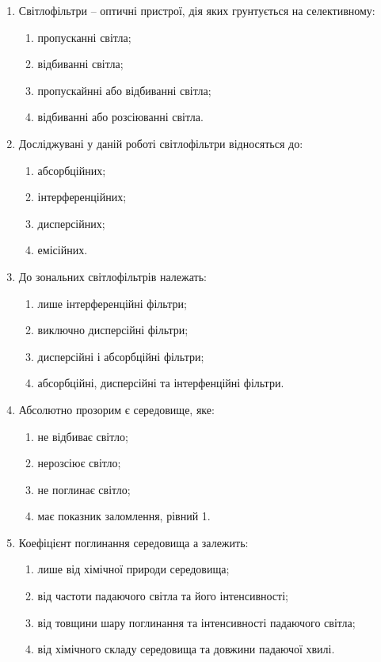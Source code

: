\documentclass[onecolumn]{el-author}
\begin{document}
\begin{enumerate}
	\item Світлофільтри -- оптичні пристрої, дія яких грунтується на
селективному:
	\begin{enumerate}
		\item пропусканні світла;
		\item відбиванні світла;
		\item пропускайнні або відбиванні світла;
		\item відбиванні або розсіюванні світла.
	\end{enumerate}
	\item Досліджувані у даній роботі світлофільтри відносяться до:
	\begin{enumerate}
		\item абсорбційних;
		\item інтерференційних;
		\item дисперсійних;
		\item емісійних.
	\end{enumerate}
	\item До зональних світлофільтрів належать:
	\begin{enumerate}
		\item лише інтерференційні фільтри;
		\item виключно дисперсійні фільтри;
		\item дисперсійні і абсорбційні фільтри;
		\item  абсорбційні, дисперсійні та інтерфенційні фільтри.
	\end{enumerate}
	\item Абсолютно прозорим є середовище, яке:
	\begin{enumerate}
		\item не відбиває світло;
		\item нерозсіює світло;
		\item не поглинає світло;
		\item має показник заломлення, рівний 1.
	\end{enumerate}
	\item  Коефіцієнт поглинання середовища а залежить:
	\begin{enumerate}
		\item лише від хімічної природи середовища;
		\item від частоти падаючого світла та його інтенсивності;
		\item від товщини шару поглинання та інтенсивності падаючого світла;
		\item від хімічного складу середовища та довжини падаючої хвилі.

\end{enumerate}
\end{enumerate}
\end{document}
